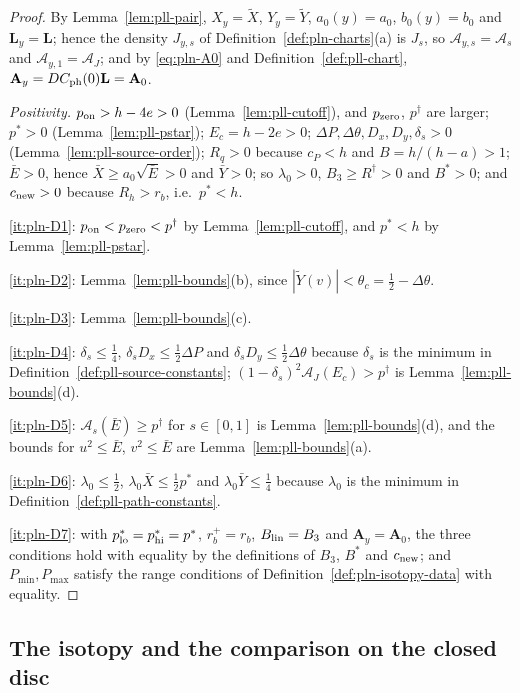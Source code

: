 \begin{proof}
By Lemma~\ref{lem:pll-pair}, $X_y=\tilde X$, $Y_y=\tilde Y$, $a_0(y)=a_0$, $b_0(y)=b_0$ and $\mathbf L_y=\mathbf L$;
hence the density $J_{y,s}$ of Definition~\ref{def:pln-charts}(a) is $J_s$, so $\mathcal A_{y,s}=\mathcal A_s$ and
$\mathcal A_{y,1}=\mathcal A_J$; and by \eqref{eq:pln-A0} and Definition~\ref{def:pll-chart},
$\mathbf A_y=DC_{\rm ph}(0)\mathbf L=\mathbf A_0$.

\emph{Positivity.} $p_{\rm on}>h-4e>0$ (Lemma~\ref{lem:pll-cutoff}), and $p_{\rm zero}$, $p^\dagger$ are larger;
$p^*>0$ (Lemma~\ref{lem:pll-pstar}); $E_c=h-2e>0$; $\Delta P,\Delta\theta,D_x,D_y,\delta_s>0$
(Lemma~\ref{lem:pll-source-order}); $R_q>0$ because $c_P<h$ and $B=h/(h-a)>1$; $\bar E>0$, hence $\bar X\ge a_0\sqrt{\bar E}>0$
and $\bar Y>0$; so $\lambda_0>0$, $B_3\ge R^\dagger>0$ and $B^*>0$; and $c_{\rm new}>0$ because $R_h>r_b$, i.e.\ $p^*<h$.

\ref{it:pln-D1}: $p_{\rm on}<p_{\rm zero}<p^\dagger$ by Lemma~\ref{lem:pll-cutoff}, and $p^*<h$ by
Lemma~\ref{lem:pll-pstar}.

\ref{it:pln-D2}: Lemma~\ref{lem:pll-bounds}(b), since $|\tilde Y(v)|<\theta_c=\frac12-\Delta\theta$.

\ref{it:pln-D3}: Lemma~\ref{lem:pll-bounds}(c).

\ref{it:pln-D4}: $\delta_s\le\frac14$, $\delta_sD_x\le\frac12\Delta P$ and $\delta_sD_y\le\frac12\Delta\theta$ because
$\delta_s$ is the minimum in Definition~\ref{def:pll-source-constants}; $(1-\delta_s)^2\mathcal A_J(E_c)>p^\dagger$ is
Lemma~\ref{lem:pll-bounds}(d).

\ref{it:pln-D5}: $\mathcal A_s(\bar E)\ge p^\dagger$ for $s\in[0,1]$ is Lemma~\ref{lem:pll-bounds}(d), and the bounds for
$u^2\le\bar E$, $v^2\le\bar E$ are Lemma~\ref{lem:pll-bounds}(a).

\ref{it:pln-D6}: $\lambda_0\le\frac12$, $\lambda_0\bar X\le\frac12p^*$ and $\lambda_0\bar Y\le\frac14$ because $\lambda_0$
is the minimum in Definition~\ref{def:pll-path-constants}.

\ref{it:pln-D7}: with $p^*_{\rm lo}=p^*_{\rm hi}=p^*$, $r_b^+=r_b$, $B_{\rm lin}=B_3$ and $\mathbf A_y=\mathbf A_0$, the
three conditions hold with equality by the definitions of $B_3$, $B^*$ and $c_{\rm new}$; and $P_{\min},P_{\max}$ satisfy
the range conditions of Definition~\ref{def:pln-isotopy-data} with equality.
\end{proof}

\subsection{The isotopy and the comparison on the closed disc}\label{sec:pll-main}

